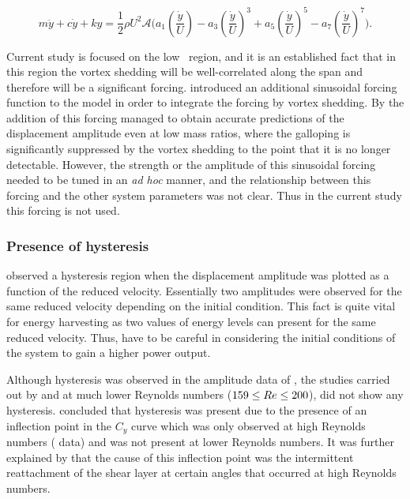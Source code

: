 \begin{equation}
\label{final_equation_motion}
m\ddot{y}{+}c\dot{y}{+}ky{=}\frac{1}{2}\rho U^2 \mathcal {A} \Bigg(a_1\left(\frac{\dot{y}}{U}\right){-}a_3\left(\frac{\dot{y}}{U}\right)^3{+}a_5\left(\frac{\dot{y}}{U}\right)^5{-}a_7\left(\frac{\dot{y}}{U}\right)^7 \Bigg).
\end{equation}

Current study is focused on the low \reynoldsnumber\ region, and it is an established fact that in this region the vortex shedding will be well-correlated along the span and therefore will be a significant forcing. \citet{Joly2012} introduced an additional sinusoidal forcing function to the model in order to integrate the forcing by vortex shedding. By the addition of this forcing \citet{Joly2012} managed to obtain accurate predictions of the displacement amplitude even at low mass ratios, where the galloping is significantly suppressed by the vortex shedding to the point that it is no longer detectable. However, the strength or the amplitude of this sinusoidal forcing needed to be tuned in an \emph{ad hoc} manner, and the relationship between this forcing and the other system parameters was not clear. Thus in the current study this forcing is not used.


\subsubsection*{Presence of hysteresis}


\cite{Parkinson1964} observed a hysteresis region when the displacement amplitude was plotted as a function of the reduced velocity. Essentially two amplitudes were observed for the same reduced velocity depending on the initial condition. This fact is quite vital for energy harvesting as two values of energy levels can present for the same reduced velocity. Thus, have to be careful in considering the initial conditions of the system to gain a higher power output.  

Although hysteresis was observed in the amplitude data of \cite{Parkinson1964}, the studies carried out by \citet{Barrero-Gil2009} and \citet{Joly2012} at much lower Reynolds numbers ($159\leq Re\leq 200$), did not show any hysteresis. \citet{Luo2003} concluded that hysteresis was present due to the presence of an inflection point in the $C_y$ curve which was only observed at high Reynolds numbers (\citet{Parkinson1964} data) and was not present at lower Reynolds numbers. It was further explained by \citet{Luo2003} that the cause of this inflection point was the intermittent reattachment of the shear layer at certain angles that occurred at high Reynolds numbers.   
 

